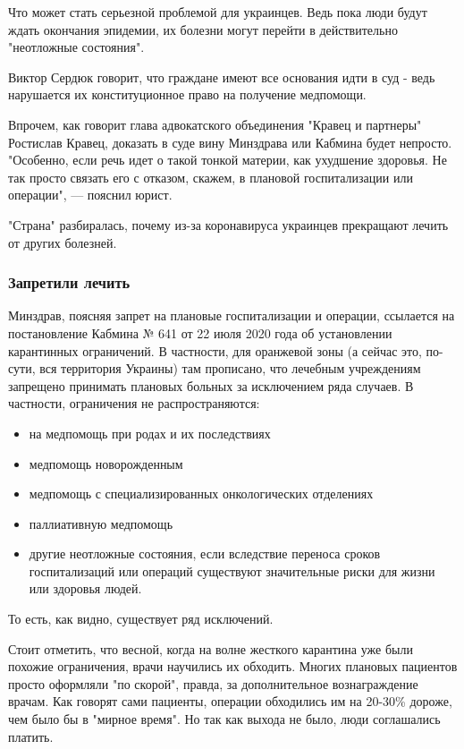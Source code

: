 Что может стать серьезной проблемой для украинцев. Ведь пока люди будут ждать
окончания эпидемии, их болезни могут перейти в действительно "неотложные
состояния".

Виктор Сердюк говорит, что граждане имеют все основания идти в суд - ведь
нарушается их конституционное право на получение медпомощи.

Впрочем, как говорит глава адвокатского объединения "Кравец и партнеры"
Ростислав Кравец, доказать в суде вину Минздрава или Кабмина будет непросто.
"Особенно, если речь идет о такой тонкой материи, как ухудшение здоровья. Не
так просто связать его с отказом, скажем, в плановой госпитализации или
операции", --- пояснил юрист.

"Страна" разбиралась, почему из-за коронавируса украинцев прекращают лечить от
других болезней.

\subsubsection{Запретили лечить}

Минздрав, поясняя запрет на плановые госпитализации и операции, ссылается на
постановление Кабмина № 641 от 22 июля 2020 года об установлении карантинных
ограничений. В частности, для оранжевой зоны (а сейчас это, по-сути, вся
территория Украины) там прописано, что лечебным учреждениям запрещено принимать
плановых больных за исключением ряда случаев. В частности, ограничения не
распространяются:

\begin{itemize}
\item на медпомощь при родах и их последствиях
\item медпомощь новорожденным
\item медпомощь с специализированных онкологических отделениях
\item паллиативную медпомощь
\item другие неотложные состояния, если вследствие переноса сроков госпитализаций или
операций существуют значительные риски для жизни или здоровья
людей.
\end{itemize}

То есть, как видно, существует ряд исключений.

Стоит отметить, что весной, когда на волне жесткого карантина уже были похожие
ограничения, врачи научились их обходить. Многих плановых пациентов просто
оформляли "по скорой", правда, за дополнительное вознаграждение врачам. Как
говорят сами пациенты, операции обходились им на 20-30\% дороже, чем было бы в
"мирное время". Но так как выхода не было, люди соглашались платить.


